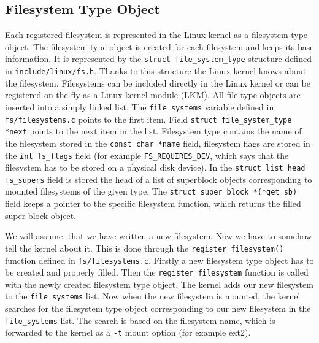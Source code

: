 \subsection{Filesystem Type Object}
\label{lab:file_system_type}
Each registered filesystem is represented in the Linux kernel as a filesystem type
object. The filesystem type object is created for each filesystem and keeps its base
information. It is represented by the \texttt{struct file\_system\_type} structure
defined in \texttt{include/linux/fs.h}. Thanks to this structure the Linux kernel knows about
the filesystem. Filesystems can be included directly in the Linux kernel or can be
registered on-the-fly as a Linux kernel module (LKM). All file type objects are inserted
into a simply linked list. The \texttt{file\_systems} variable defined in
\texttt{fs/filesystems.c} points to the first item. Field \texttt{struct
file\_system\_type *next} points to the next item in the list. Filesystem type
contains the name of the filesystem stored in the \texttt{const char *name} field, filesystem
flags are stored in the \texttt{int fs\_flags} field (for example
\texttt{FS\_REQUIRES\_DEV}, which says that the filesystem has to be stored on a
physical disk device). In the \texttt{struct list\_head fs\_supers} field is stored
the head of a list of superblock objects corresponding to mounted filesystems of the
given type. The \texttt{struct super\_block *(*get\_sb)} field keeps a pointer to the
specific filesystem function, which returns the filled super block object. 

We will assume, that we have written a new filesystem. Now we have to somehow tell the kernel about
it. This is done through the \texttt{register\_filesystem()} function defined in
\texttt{fs/filesystems.c}. Firstly a new filesystem type object has to be created and
properly filled. Then the \texttt{register\_filesystem} function is called with the newly
created filesystem type object. The kernel adds our new filesystem to the
\texttt{file\_systems} list. Now when the new filesystem is mounted, the kernel searches
for the filesystem type object corresponding to our new filesystem in the
\texttt{file\_systems} list. The search is based on the filesystem name, which is
forwarded to the kernel as a \texttt{-t} mount option (for example ext2). 

